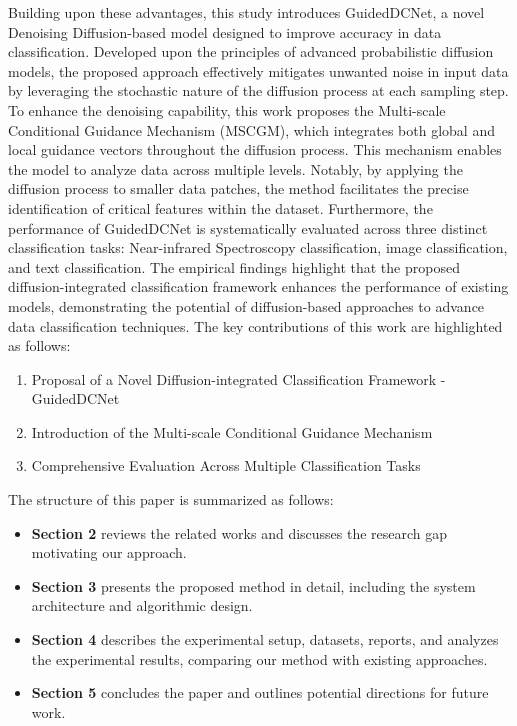 \documentclass[a4paper,fleqn]{cas-sc}
\begin{document}
Building upon these advantages, this study introduces GuidedDCNet, a novel Denoising Diffusion-based model designed to improve accuracy in data classification. Developed upon the principles of advanced probabilistic diffusion models, the proposed approach effectively mitigates unwanted noise in input data by leveraging the stochastic nature of the diffusion process at each sampling step. To enhance the denoising capability, this work proposes the Multi-scale Conditional Guidance Mechanism (MSCGM), which integrates both global and local guidance vectors throughout the diffusion process. This mechanism enables the model to analyze data across multiple levels. Notably, by applying the diffusion process to smaller data patches, the method facilitates the precise identification of critical features within the dataset. Furthermore, the performance of GuidedDCNet is systematically evaluated across three distinct classification tasks: Near-infrared Spectroscopy classification, image classification, and text classification. The empirical findings highlight that the proposed diffusion-integrated classification framework enhances the performance of existing models, demonstrating the potential of diffusion-based approaches to advance data classification techniques.
The key contributions of this work are highlighted as follows:
\begin{enumerate}
    \item Proposal of a Novel Diffusion-integrated Classification Framework - GuidedDCNet
    \item Introduction of the Multi-scale Conditional Guidance Mechanism
    \item Comprehensive Evaluation Across Multiple Classification Tasks
\end{enumerate}
The structure of this paper is summarized as follows:
\begin{itemize}
    \item \textbf{Section 2} reviews the related works and discusses the research gap motivating our approach.
    \item \textbf{Section 3} presents the proposed method in detail, including the system architecture and algorithmic design.
    \item \textbf{Section 4} describes the experimental setup, datasets, reports, and analyzes the experimental results, comparing our method with existing approaches.
    \item \textbf{Section 5} concludes the paper and outlines potential directions for future work.
\end{itemize}
\end{document}
